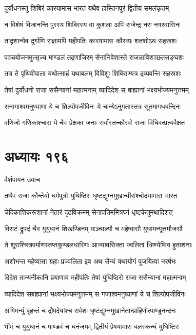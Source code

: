 \twolineshloka
{दुर्योधनस्तु शिबिरं कारयामास भारत}
{यथैव हास्तिनपुरं द्वितीयं समलंकृतम्}


\twolineshloka
{न विशेषं विजानन्ति पुरस्य शिबिरस्य वा}
{कुशला अपि राजेन्द्र नरा नगरवासिनः}


\twolineshloka
{तादृशान्येव दुर्गाणि राज्ञामपि महीपतिः}
{कारयामास कौरव्यः शतशोऽथ सहस्रशः}


\twolineshloka
{पञ्चयोजनमुत्सृज्य माण्डलं तद्रणाजिरम्}
{सेनानिवेशास्ते राजन्नाविशञ्छतसङ्घशः}


\twolineshloka
{तत्र ते पृथिवीपाला यथोत्साहं यथाबलम्}
{विविशुः शिबिराण्यत्र द्रव्यवन्ति सहस्रशः}


\twolineshloka
{तेषां दुर्योधनो राजा ससैन्यानां महात्मनाम्}
{व्यादिदेश स बाह्यानां भक्ष्यभोज्यमनुत्तमम्}


\twolineshloka
{सनागाश्वमनुण्याणां ये च शिल्पोपजीविनः}
{ये चान्येऽनुगतास्तत्र सूतमागधबन्दिनः}


\twolineshloka
{वणिजो गणिकाश्चारा ये चैव प्रेक्षका जनाः}
{सर्वांस्तन्कौरवो राजा विधिवत्प्रत्यवैक्षत}


\chapter{अध्यायः १९६}
\twolineshloka
{वैशंपायन उवाच}
{}


\twolineshloka
{तथैव राजा कौन्तेयो धर्मपुत्रो युधिष्ठिरः}
{धृष्टद्युम्नमुखान्वीरांश्चोदयामास भारत}


\twolineshloka
{चेदिकाशिकरूशानां नेतारं दृढविक्रमम्}
{सेनापतिममित्रघ्नं धृष्टकेतुमथादिशत्}


\twolineshloka
{विराटं द्रुपदं चैव युयुधानं शिखण्डिनम्}
{पाञ्चाल्यौ च महेष्वासौ युधामन्यूत्तमौजसौ}


\twolineshloka
{ते शूराश्चित्रवर्माणस्तप्तकुण्डलधारिणः}
{आज्यावसिक्ता ज्वलिता धिष्ण्येष्विव हुताशनाः}


\twolineshloka
{अशोभन्त महेष्वासा ग्रहाः प्रज्वलिता इव}
{अथ सैन्यं यथायोगं पूजयित्वा नरर्षभः}


\twolineshloka
{दिदेश तान्यनीकानि प्रयाणाय महीपतिः}
{तेषां युधिष्ठिरो राजा ससैन्यानां महात्मनाम्}


\twolineshloka
{व्यादिदेश सबाह्यानां भक्ष्यभोज्यमनुत्तमम्}
{स गजाश्वमनुष्याणां ये च शिल्पोपजीविनः}


\twolineshloka
{अभिमन्युं बृहन्तं च द्रौपदेयांश्च सर्वशः}
{धृष्टद्युम्नमुखानेतान्प्राहिणोत्पाण्डुनन्दनः}


\twolineshloka
{भीमं च युयुधानं च पाण्डवं च धनंजयम्}
{द्वितीयं प्रेषयामास बलस्कन्धं युधिष्टिरः}


